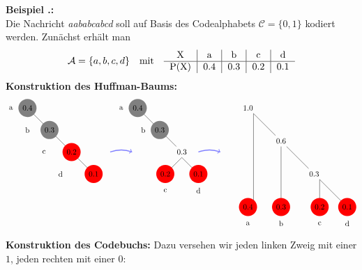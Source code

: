 \documentclass[a4paper,12pt]{article}
\newcommand{\A}{\mathcal A}
\newcommand{\C}{\mathcal C}
\newcounter{Beispiel}
\newenvironment{Beispiel}{
\medskip
        
        \setlength{\parindent}{0pt}
        \addtocounter{Beispiel}{1}
        \textbf{\textsf{Beispiel \thesubsection.\theBeispiel}:}\\}{
        \nopagebreak
        \vspace{-1.0ex}
        \bigskip
        
}
\begin{document}
\begin{Beispiel}
Die Nachricht {\it aababcabcd} soll auf Basis des Codealphabets $\C=\{0,1\}$ kodiert werden. Zunächst erhält man
\begin{align*}
 \A = \{a, b, c, d\}\quad \text{mit}\quad
\begin{tabular}{c|c|c|c|c}
X & a & b & c & d
\\
\hline
P(X) & 0.4 & 0.3 & 0.2 & 0.1
\\
\end{tabular} 
\end{align*}
\textbf{Konstruktion des Huffman-Baums:}
\begin{align*}
\begin{tikzpicture}
 \draw(0.0,-0.75)node[]{a}
		(0.75,-0.75)node[circle=0.3cm,fill = gray]{0.4}
		 (1.0,-1.0) -- (1.5,-1.5)
		(1.75,-1.75) node [circle=0.3cm,fill = gray]{0.3}
		(0.75,-1.75) node []{b}
		(2.0,-2.0) -- (2.5,-2.5);
		\draw[->, blue!50, very thick] (4.5,-2.75) to[bend left=20]
 (5.5,-2.75);
		\draw
		(2.75,-2.75) node [circle=0.3cm, fill=red]{0.2}
		(1.5,-2.75) node []{c}
			(3.0,-3.0) -- (3.5,-3.5)
			(3.75,-3.75) node [circle=0.3cm, fill=red]{0.1}
			(2.25,-3.75) node []{d}
	(5.0,-0.75)node[]{a}
	(5.75,-0.75) node [circle=0.3cm,fill = gray]{0.4}
  (6.0,-1.0) -- (6.5,-1.5)
	(6.0,-1.75)node[]{b}
	(6.75,-1.75) node [circle=0.3cm,fill = gray]{0.3}
(7.0,-2.0) -- (7.5,-2.5)
(7.75,-2.75) node [circle=0.3cm]{0.3}
		(7.75,-3.0) -- (7.25,-3.5)
		(7.0,-4.5)node[]{c}
		(7.0,-3.75) node [circle=0.3cm, fill=red]{0.2};
		\draw[->, blue!50, very thick] (8.5,-2.75) to[bend left=20]
 (9.5,-2.75);
		\draw
		(7.75,-3.0) -- (8.25,-3.5)
		(8.5,-4.5)node[]{d}
		(8.5,-3.75) node [circle=0.3cm, fill=red]{0.1}
	(10.75,-0.75) node []{1.0}
	(11.0,-1.0) -- (11.0,-5.0)
  (11.0,-1.0) -- (12.0,-2.0)
	(12.25,-2.25) node []{0.6}
	(12.25,-2.5) -- (12.25,-5.0)
	(12.5,-2.5) -- (13.5,-3.5)
	(13.75,-3.75) node []{0.3}
	(14.0,-4.0) -- (15.0,-5.0)
	(14.0,-4.0) -- (14.0,-5.0)
	(15.25,-5.25) node [circle=0.3cm, fill=red]{0.1}
	(15.25,-6.0)node[]{d}
	(14.0,-5.25) node [circle=0.3cm, fill=red]{0.2}
	(14.0,-6.0)node[]{c}
	(12.25,-5.25) node [circle=0.3cm, fill=red]{0.3}
	(12.25,-6.0)node[]{b}
	(10.75,-5.25) node [circle=0.3cm, fill=red]{0.4}
	(10.75,-6.0)node[]{a};
\end{tikzpicture}
\end{align*}
\textbf{Konstruktion des Codebuchs:}
Dazu versehen wir jeden linken Zweig mit einer $1$, jeden rechten mit einer $0$:
\par
\hspace{1.5cm}

\end{Beispiel}
\end{document}
